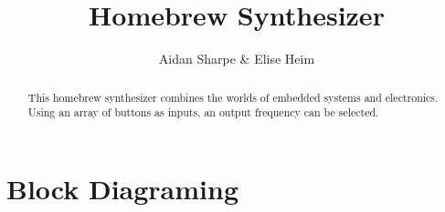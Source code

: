 \documentclass{IEEEtran}
\title{Homebrew Synthesizer}
\author{Aidan Sharpe \& Elise Heim}
\begin{document}
\maketitle

\begin{abstract}
    This homebrew synthesizer combines the worlds of embedded systems and electronics. Using an array of buttons as inputs, an output frequency can be selected. 
\end{abstract}

\section{Block Diagraming}
\end{document}

